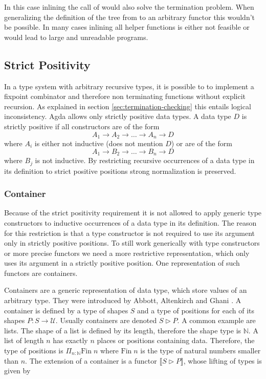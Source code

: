 \documentclass[10pt,a4paper,twoside]{report}
\begin{document}
In this case inlining the call of  would also solve the
termination problem.
When generalizing the definition of the tree from  to an
arbitrary functor this wouldn't be possible.
In many cases inlining all helper functions is either not feasible or would lead
to large and unreadable programs.


\subsection{Strict Positivity}

In a type system with arbitrary recursive types, it is possible to to implement a
fixpoint combinator and therefore non terminating functions without explicit
recursion.
As explained in section \ref{sec:termination-checking} this entails logical
inconsistency.
Agda allows only strictly positive data types.
A data type $D$ is strictly positive if all constructors are of the form
$$
  A_1 \rightarrow A_2 \rightarrow \dots \rightarrow A_n \rightarrow D
$$
where $A_i$ is either not inductive (does not mention $D$) or are of the form
$$
A_1 \rightarrow B_2 \rightarrow \dots \rightarrow B_n \rightarrow D
$$
where $B_j$ is not inductive.
By restricting recursive occurrences of a data type in its definition to strict
positive positions strong normalization is preserved.

\subsubsection{Container}
\label{container}

Because of the strict positivity requirement it is not allowed to apply generic
type constructors to inductive occurrences of a data type in its definition.
The reason for this restriction is that a type constructor is not required to
use its argument only in strictly positive positions.
To still work generically with type constructors or more precise functors we
need a more restrictive representation, which only uses its argument in a
strictly positive position.
One representation of such functors are containers.

Containers are a generic representation of data type, which store values of an
arbitrary type.
They were introduced by Abbott, Altenkirch and Ghani
\cite{DBLP:conf/fossacs/AbbottAG03}.
A container is defined by a type of shapes $S$ and a type of positions for each
of its shapes $P : S \rightarrow \mathcal{U}$.
Usually containers are denoted $S \rhd P$.
A common example are lists.
The shape of a list is defined by its length, therefore the shape type is
$\mathbb{N}$.
A list of length $n$ has exactly $n$ places or positions containing data.
Therefore, the type of positions is $\Pi_{n : \mathbb{N}}\mathrm{Fin}\;n$ where
$\mathrm{Fin}\;n$ is the type of natural numbers smaller than $n$.
The extension of a container is a functor $\lBrack S \rhd P \rBrack $,
whose lifting of types is given by
\end{document}
